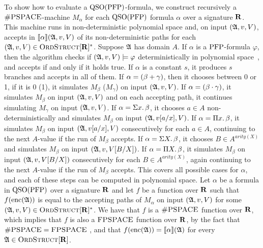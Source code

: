 To show how to evaluate a ${\rm QSO}({\rm PFP})$-formula, we construct recursively a $\text{\sc \#PSPACE}$-machine $M_{\alpha}$ for each ${\rm QSO}({\rm PFP})$ formula $\alpha$ over a signature $\mathbf{R}$. This machine runs in non-deterministic polynomial space and, on input $(\mathfrak{A},v,V)$, accepts in ${\llbracket{}{\alpha}\rrbracket}(\mathfrak{A},v,V)$ of its non-deterministic paths for each $(\mathfrak{A},v,V) \in \text{\sc OrdStruct}[\mathbf{R}]^*$. Suppose $\mathfrak{A}$ has domain $A$. If $\alpha$ is a ${\rm PFP}$-formula $\varphi$, then the algorithm checks if $(\mathfrak{A},v,V)\models\varphi$ deterministically in polynomial space~\cite{L04}, and accepts if and only if it holds true. If $\alpha$ is a constant $s$, it produces $s$ branches and accepts in all of them. If $\alpha = (\beta + \gamma)$, then it chooses between 0 or 1, if it is 0 (1), it simulates $M_{\beta}$ ($M_{\gamma}$) on input $(\mathfrak{A},v,V)$. If $\alpha = (\beta \cdot \gamma)$, it simulates $M_{\beta}$ on input $(\mathfrak{A},v,V)$ and on each accepting path, it continues simulating $M_{\gamma}$ on input $(\mathfrak{A},v,V)$.
If $\alpha = \Sigma{x}.\,\beta$, it chooses $a\in A$ non-deterministically and simulates $M_{\beta}$ on input $(\mathfrak{A},v[a/x],V)$. If $\alpha = \Pi{x}.\,\beta$, it simulates $M_{\beta}$ on input $(\mathfrak{A},v[a/x],V)$ consecutively for each $a\in A$, continuing to the next $A$-value if the run of $M_{\beta}$ accepts. If $\alpha = \Sigma{X}.\,\beta$, it chooses $B\in A^{arity(X)}$ and simulates $M_{\beta}$ on input $(\mathfrak{A},v,V[B/X])$. If $\alpha = \Pi{X}.\,\beta$, it simulates $M_{\beta}$ on input $(\mathfrak{A},v,V[B/X])$ consecutively for each $B\in A^{arity(X)}$, again continuing to the next $A$-value if the run of $M_{\beta}$ accepts. This covers all possible cases for $\alpha$, and each of these steps can be computed in polynomial space. Let $\alpha$ be a formula in ${\rm QSO}({\rm PFP})$ over a signature $\mathbf{R}$ and let $f$ be a function over $\mathbf{R}$ such that $f({\rm enc}(\mathfrak{A}))$ is equal to the accepting paths of $M_{\alpha}$ on input $(\mathfrak{A},v,V)$ for some $(\mathfrak{A},v,V) \in \text{\sc OrdStruct}[\mathbf{R}]^*$. We have that $f$ is a $\text{\sc \#PSPACE}$ function over $\mathbf{R}$, which implies that $f$ is also a $\text{\sc FPSPACE}$ function over $\mathbf{R}$, by the fact that $\text{\sc \#PSPACE} = \text{\sc FPSPACE}$ \cite{Ladner89}, and that $f({\rm enc}(\mathfrak{A})) = {\llbracket{}{\alpha}\rrbracket}(\mathfrak{A})$ for every $\mathfrak{A}\in\text{\sc OrdStruct}[\mathbf{R}]$.

